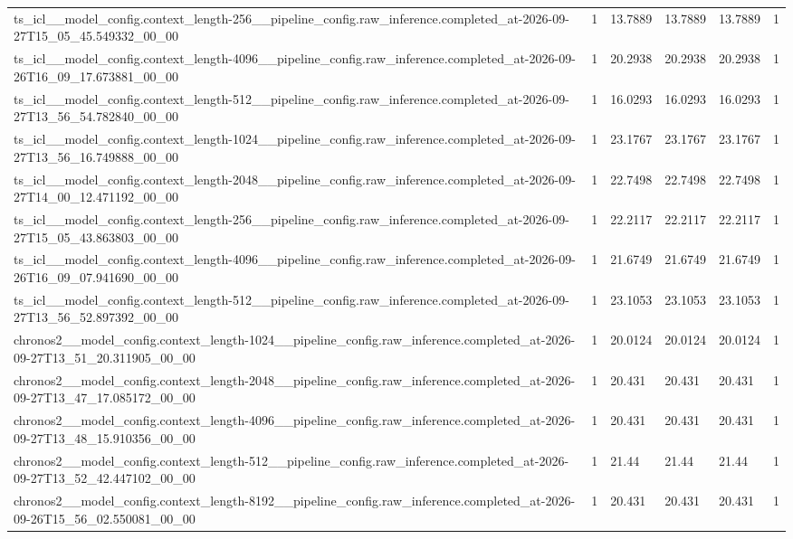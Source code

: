 \begin{tabular}{llllll}
ts\_icl\_\_model\_config.context\_length-256\_\_pipeline\_config.raw\_inference.completed\_at-2026-09-27T15\_05\_45.549332\_00\_00 & 1 & 13.7889 & 13.7889 & 13.7889 & 1 \\
ts\_icl\_\_model\_config.context\_length-4096\_\_pipeline\_config.raw\_inference.completed\_at-2026-09-26T16\_09\_17.673881\_00\_00 & 1 & 20.2938 & 20.2938 & 20.2938 & 1 \\
ts\_icl\_\_model\_config.context\_length-512\_\_pipeline\_config.raw\_inference.completed\_at-2026-09-27T13\_56\_54.782840\_00\_00 & 1 & 16.0293 & 16.0293 & 16.0293 & 1 \\
ts\_icl\_\_model\_config.context\_length-1024\_\_pipeline\_config.raw\_inference.completed\_at-2026-09-27T13\_56\_16.749888\_00\_00 & 1 & 23.1767 & 23.1767 & 23.1767 & 1 \\
ts\_icl\_\_model\_config.context\_length-2048\_\_pipeline\_config.raw\_inference.completed\_at-2026-09-27T14\_00\_12.471192\_00\_00 & 1 & 22.7498 & 22.7498 & 22.7498 & 1 \\
ts\_icl\_\_model\_config.context\_length-256\_\_pipeline\_config.raw\_inference.completed\_at-2026-09-27T15\_05\_43.863803\_00\_00 & 1 & 22.2117 & 22.2117 & 22.2117 & 1 \\
ts\_icl\_\_model\_config.context\_length-4096\_\_pipeline\_config.raw\_inference.completed\_at-2026-09-26T16\_09\_07.941690\_00\_00 & 1 & 21.6749 & 21.6749 & 21.6749 & 1 \\
ts\_icl\_\_model\_config.context\_length-512\_\_pipeline\_config.raw\_inference.completed\_at-2026-09-27T13\_56\_52.897392\_00\_00 & 1 & 23.1053 & 23.1053 & 23.1053 & 1 \\
chronos2\_\_model\_config.context\_length-1024\_\_pipeline\_config.raw\_inference.completed\_at-2026-09-27T13\_51\_20.311905\_00\_00 & 1 & 20.0124 & 20.0124 & 20.0124 & 1 \\
chronos2\_\_model\_config.context\_length-2048\_\_pipeline\_config.raw\_inference.completed\_at-2026-09-27T13\_47\_17.085172\_00\_00 & 1 & 20.431 & 20.431 & 20.431 & 1 \\
chronos2\_\_model\_config.context\_length-4096\_\_pipeline\_config.raw\_inference.completed\_at-2026-09-27T13\_48\_15.910356\_00\_00 & 1 & 20.431 & 20.431 & 20.431 & 1 \\
chronos2\_\_model\_config.context\_length-512\_\_pipeline\_config.raw\_inference.completed\_at-2026-09-27T13\_52\_42.447102\_00\_00 & 1 & 21.44 & 21.44 & 21.44 & 1 \\
chronos2\_\_model\_config.context\_length-8192\_\_pipeline\_config.raw\_inference.completed\_at-2026-09-26T15\_56\_02.550081\_00\_00 & 1 & 20.431 & 20.431 & 20.431 & 1 \\

\end{tabular}
